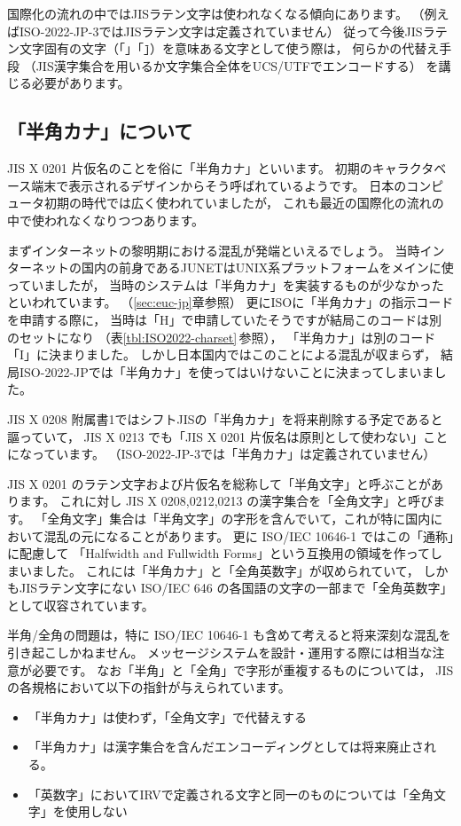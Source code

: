\documentclass[a4j,10pt,fleqn]{jsarticle}
\begin{document}
国際化の流れの中ではJISラテン文字は使われなくなる傾向にあります。
（例えばISO-2022-JP-3ではJISラテン文字は定義されていません）
従って今後JISラテン文字固有の文字（「\texttt{\yen}」「\texttt{\={}}」）を意味ある文字として使う際は，
何らかの代替え手段
（JIS漢字集合を用いるか文字集合全体をUCS/UTFでエンコードする）
を講じる必要があります。


\subsection{「半角カナ」について} \label{sec:zen-han}

JIS X 0201 片仮名のことを俗に「半角カナ」といいます。
初期のキャラクタベース端末で表示されるデザインからそう呼ばれているようです。
日本のコンピュータ初期の時代では広く使われていましたが，
これも最近の国際化の流れの中で使われなくなりつつあります。

まずインターネットの黎明期における混乱が発端といえるでしょう。
当時インターネットの国内の前身であるJUNETはUNIX系プラットフォームをメインに使っていましたが，
当時のシステムは「半角カナ」を実装するものが少なかったといわれています。
（\ref{sec:euc-jp}章参照）
更にISOに「半角カナ」の指示コードを申請する際に，
当時は「H」で申請していたそうですが結局このコードは別のセットになり
（表\ref{tbl:ISO2022-charset}\,参照），
「半角カナ」は別のコード「I」に決まりました。
しかし日本国内ではこのことによる混乱が収まらず，
結局ISO-2022-JPでは「半角カナ」を使ってはいけないことに決まってしまいました。

JIS X 0208 附属書1ではシフトJISの「半角カナ」を将来削除する予定であると謳っていて，
JIS X 0213 でも「JIS X 0201 片仮名は原則として使わない」ことになっています。
（ISO-2022-JP-3では「半角カナ」は定義されていません）

JIS X 0201 のラテン文字および片仮名を総称して「半角文字」と呼ぶことがあります。
これに対し JIS X 0208,0212,0213 の漢字集合を「全角文字」と呼びます。
「全角文字」集合は「半角文字」の字形を含んでいて，これが特に国内において混乱の元になることがあります。
更に ISO/IEC 10646-1 ではこの「通称」に配慮して
「Halfwidth and Fullwidth Forms」という互換用の領域を作ってしまいました。
これには「半角カナ」と「全角英数字」が収められていて，
しかもJISラテン文字にない ISO/IEC 646 の各国語の文字の一部まで「全角英数字」として収容されています。

半角/全角の問題は，特に ISO/IEC 10646-1 も含めて考えると将来深刻な混乱を引き起こしかねません。
メッセージシステムを設計・運用する際には相当な注意が必要です。
なお「半角」と「全角」で字形が重複するものについては，
JISの各規格において以下の指針が与えられています。
\begin{itemize}
\item 「半角カナ」は使わず，「全角文字」で代替えする
\item 「半角カナ」は漢字集合を含んだエンコーディングとしては将来廃止される。
\item 「英数字」においてIRVで定義される文字と同一のものについては「全角文字」を使用しない
\end{itemize}
\end{document}
